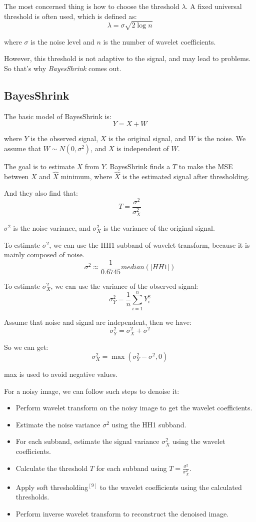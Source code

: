 \documentclass[10pt,a4paper,oneside,numbers=noenddot]{scrbook}
\theoremstyle{ctplain}
\theoremstyle{ctresult}
\begin{document}
The most concerned thing is how to choose the threshold $\lambda$. A fixed universal threshold
is often used, which is defined as:
\[
  \lambda = \sigma \sqrt{2 \log n}
\]

where $\sigma$ is the noise level and $n$ is the number of wavelet coefficients.

However, this threshold is not adaptive to the signal, and may lead to problems. So that's
why \emph{BayesShrink} comes out.

\subsection{BayesShrink}

The basic model of BayesShrink is:
\[
  Y = X + W
\]

where $Y$ is the observed signal, $X$ is the original signal, and $W$ is the noise. We
assume that $W \sim N(0, \sigma^2)$, and $X$ is independent of $W$.

The goal is to estimate $X$ from $Y$. BayesShrink finds a $T$ to make the MSE between $X$
and $\hat{X}$ minimum, where $\hat{X}$ is the estimated signal after thresholding.

And they also find that:
\[
  T = \frac{\sigma^2}{\sigma_X^2}
\]

$\sigma^2$ is the noise variance, and $\sigma_X^2$ is the variance of the original signal.

To estimate $\sigma^2$, we can use the HH1 subband of wavelet transform, because it is
mainly composed of noise.
\[
  \sigma^2 \approx \frac{1}{0.6745} median(|HH1|)
\]

To estimate $\sigma_X^2$, we can use the variance of the observed signal:
\[
  \sigma_Y^2 = \frac{1}{n} \sum_{i=1}^{n} Y_i^2
\]

Assume that noise and signal are independent, then we have:
\[
  \sigma_Y^2 = \sigma_X^2 + \sigma^2
\]

So we can get:
\[
  \sigma_X^2 = \max(\sigma_Y^2 - \sigma^2, 0)
\]

max is used to avoid negative values.

For a noisy image, we can follow such steps to denoise it:
\begin{itemize}
  \item Perform wavelet transform on the noisy image to get the wavelet coefficients.
  \item Estimate the noise variance $\sigma^2$ using the HH1 subband.
  \item For each subband, estimate the signal variance $\sigma_X^2$ using the wavelet
  coefficients.
  \item Calculate the threshold $T$ for each subband using $T = \frac{\sigma^2}{\sigma_X^2}$.
  \item Apply soft thresholding$^{[9]}$ to the wavelet coefficients using the calculated thresholds.
  \item Perform inverse wavelet transform to reconstruct the denoised image.
\end{itemize}
\end{document}
